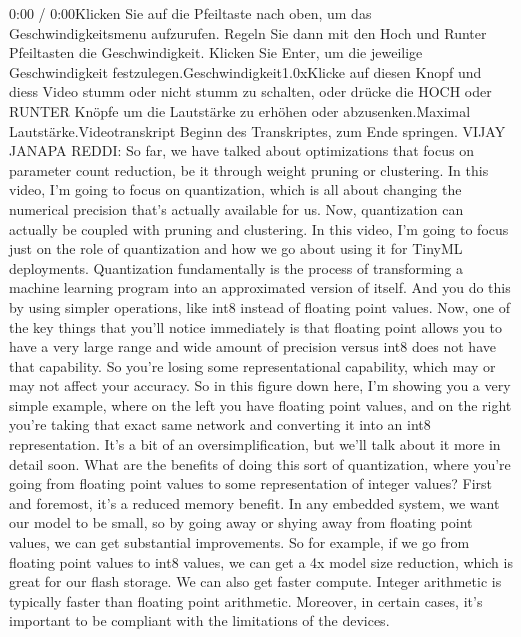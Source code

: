 {{{{{    0:00 / 0:00Klicken Sie auf die Pfeiltaste nach oben, um das Geschwindigkeitsmenu aufzurufen. Regeln Sie dann mit den Hoch und Runter Pfeiltasten die Geschwindigkeit. Klicken Sie Enter, um die jeweilige Geschwindigkeit festzulegen.Geschwindigkeit1.0xKlicke auf diesen Knopf und diess Video stumm oder nicht stumm zu schalten, oder drücke die HOCH oder RUNTER Knöpfe um die Lautstärke zu erhöhen oder abzusenken.Maximal Lautstärke.Videotranskript
    Beginn des Transkriptes, zum Ende springen.
    VIJAY JANAPA REDDI: So far, we have talked
    about optimizations that focus on parameter count reduction,
    be it through weight pruning or clustering.
    In this video, I'm going to focus on quantization,
    which is all about changing the numerical precision that's actually
    available for us.
    Now, quantization can actually be coupled with pruning and clustering.
    In this video, I'm going to focus just on the role of quantization
    and how we go about using it for TinyML deployments.
    Quantization fundamentally is the process
    of transforming a machine learning program
    into an approximated version of itself.
    And you do this by using simpler operations,
    like int8 instead of floating point values.
    Now, one of the key things that you'll notice immediately
    is that floating point allows you to have a very large range
    and wide amount of precision versus int8 does not have that capability.
    So you're losing some representational capability, which may or may not
    affect your accuracy.
    So in this figure down here, I'm showing you
    a very simple example, where on the left you have floating point values,
    and on the right you're taking that exact same network
    and converting it into an int8 representation.
    It's a bit of an oversimplification, but we'll
    talk about it more in detail soon.
    What are the benefits of doing this sort of quantization,
    where you're going from floating point values
    to some representation of integer values?
    First and foremost, it's a reduced memory benefit.
    In any embedded system, we want our model to be small,
    so by going away or shying away from floating point values,
    we can get substantial improvements.
    So for example, if we go from floating point values to int8 values,
    we can get a 4x model size reduction, which is great for our flash storage.
    We can also get faster compute.
    Integer arithmetic is typically faster than floating point arithmetic.
    Moreover, in certain cases, it's important to be compliant
    with the limitations of the devices.
}}}}}
